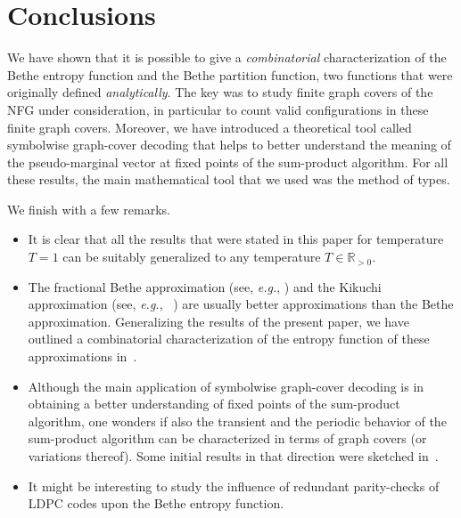 \documentclass[journal, twocolumn]{IEEEtran}
\newcommand{\eg}{\emph{e.g.}}
\newcommand{\Rpp}{\mathbb{R}_{>0}}
\newcommand{\?}{\mathrm{?}}
\begin{document}
\section{Conclusions}
\label{sec:conclusions:1}


We have shown that it is possible to give a \emph{combinatorial}
characterization of the Bethe entropy function and the Bethe partition
function, two functions that were originally defined \emph{analytically}. The
key was to study finite graph covers of the NFG under
consideration, in particular to count valid configurations in these finite
graph covers. Moreover, we have introduced a theoretical tool called
symbolwise graph-cover decoding that helps to better understand the meaning of
the pseudo-marginal vector at fixed points of the sum-product algorithm. For
all these results, the main mathematical tool that we used was the method of
types.

We finish with a few remarks.
\begin{itemize}

\item It is clear that all the results that were stated in this paper for
  temperature $T = 1$ can be suitably generalized to any temperature $T \in
  \Rpp$.

\item The fractional Bethe approximation (see, \eg,
  \cite{Wiegerinck:Heskes:03:1}) and the Kikuchi approximation (see, \eg,
  ~\cite{Yedidia:Freeman:Weiss:05:1, McEliece:Yildirim:03:1}) are usually
  better approximations than the Bethe approximation. Generalizing the results
  of the present paper, we have outlined a combinatorial characterization of
  the entropy function of these approximations in~\cite{Vontobel:11:1}.

\item Although the main application of symbolwise graph-cover decoding is in
  obtaining a better understanding of fixed points of the sum-product
  algorithm, one wonders if also the transient and the periodic behavior of
  the sum-product algorithm can be characterized in terms of graph covers (or
  variations thereof). Some initial results in that direction were sketched
  in~\cite{Vontobel:09:1}.

\item It might be interesting to study the influence of redundant
  parity-checks of LDPC codes upon the Bethe entropy function.

\end{itemize}
\end{document}
